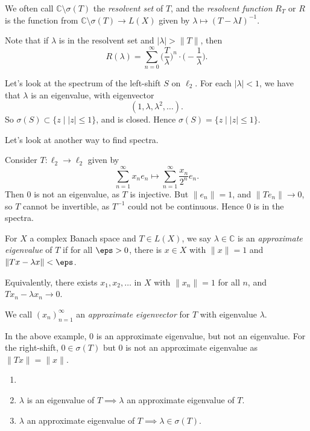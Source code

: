 \documentclass[12pt]{article}
\begin{document}
We often call $\mathbb{C} \setminus \sigma(T)$ the \emph{resolvent set} of $T$, and the \emph{resolvent function} $R_T$ or $R$ is the function from $\mathbb{C} \setminus \sigma(T) \to L(X)$ given by $\lambda \mapsto (T - \lambda I)^{-1}$.

Note that if $\lambda$ is in the resolvent set and $|\lambda| > \|T\|$, then
\[
R(\lambda) = \sum_{n = 0}^{\infty} \biggl(\frac{T}{\lambda}\biggr)^{n} \cdot \biggl( - \frac{1}{\lambda}\biggr).
\]

\begin{exbox}
	Let's look at the spectrum of the left-shift $S$ on $\ell_2$. For each $|\lambda| < 1$, we have that $\lambda$ is an eigenvalue, with eigenvector
	\[
		(1, \lambda, \lambda^2, \ldots).
	\]
	So $\sigma(S) \subset \{z \mid |z| \leq 1\}$, and is closed. Hence $\sigma(S) = \{z \mid |z| \leq 1\}$.
\end{exbox}

Let's look at another way to find spectra.

\begin{exbox}
	Consider $T : \ell_2 \to \ell_2$ given by
	\[
	\sum_{n = 1}^{\infty} x_n e_n \mapsto \sum_{n = 1}^{\infty} \frac{x_n}{2^n} e_n.
	\]
	Then $0$ is not an eigenvalue, as $T$ is injective. But $\|e_n\| = 1$, and $\|T e_n\| \to 0$, so $T$ cannot be invertible, as $T^{-1}$ could not be continuous. Hence $0$ is in the spectra.
\end{exbox}

For $X$ a complex Banach space and $T \in L(X)$, we say $\lambda \in \mathbb{C}$ is an \emph{approximate eigenvalue} of $T$ if for all $\eps > 0$, there is $x \in X$ with $\|x\| = 1$ and $\|Tx - \lambda x\| < \eps$.

Equivalently, there exists $x_1, x_2, \ldots$ in $X$ with $\|x_n\| = 1$ for all $n$, and $Tx_n - \lambda x_n \to 0$.

We call $(x_n)_{n = 1}^{\infty}$ an \emph{approximate eigenvector} for $T$ with eigenvalue $\lambda$.

In the above example, $0$ is an approximate eigenvalue, but not an eigenvalue. For the right-shift, $0 \in \sigma(T)$ but $0$ is not an approximate eigenvalue as $\|Tx\| = \|x\|$.

\begin{remark}
	\begin{enumerate}
		\item[]
		\item $\lambda$ is an eigenvalue of $T \implies \lambda$ an approximate eigenvalue of $T$.
		\item $\lambda$ an approximate eigenvalue of $T \implies \lambda \in \sigma(T)$.
	\end{enumerate}
\end{remark}
\end{document}
